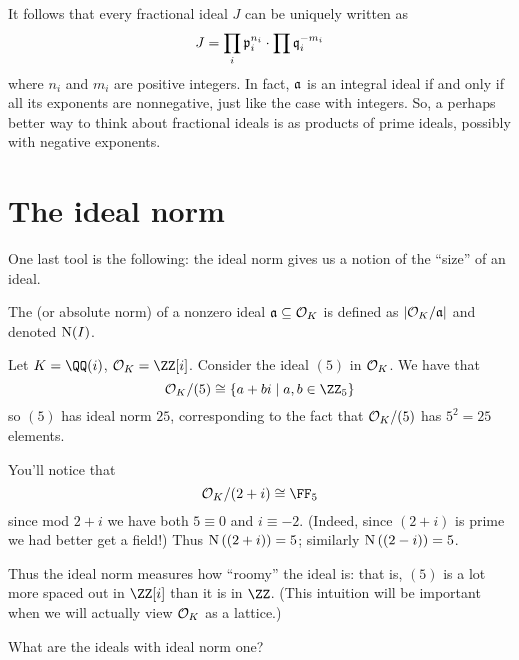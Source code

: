It follows that every fractional ideal $J$ can be uniquely written as
\[ J = \prod_i \pp_i^{n_i} \cdot \prod \qq_i^{-m_i} \]
where $n_i$ and $m_i$ are positive integers.
In fact, $\aa$ is an integral ideal if and only if all its exponents are nonnegative,
just like the case with integers.
So, a perhaps better way to think about fractional ideals is
as products of prime ideals, possibly with negative exponents.

\section{The ideal norm}
One last tool is the following:
the ideal norm gives us a notion of the ``size'' of an ideal.
\begin{definition}
	The  (or absolute norm)
	of a nonzero ideal $\aa \subseteq \OO_K$ is defined as
	$\left\lvert \OO_K / \aa \right\rvert$ and denoted $\Norm(I)$.
\end{definition}
\begin{example}
	Let $K = \QQ(i)$, $\OO_K = \ZZ[i]$.
	Consider the ideal $(5)$ in $\OO_K$.
	We have that 
	\[ \OO_K / (5) \cong \{ a+bi \mid a,b \in \Zc5 \} \]
	so $(5)$ has ideal norm $25$,
	corresponding to the fact that $\OO_K/(5)$ has $5^2=25$ elements.
\end{example}

\begin{example}
	You'll notice that \[ \OO_K / (2+i) \cong \FF_5 \]
	since mod $2+i$ we have both $5 \equiv 0$ and $i \equiv -2$.
	(Indeed, since $(2+i)$ is prime we had better get a field!)
	Thus $\Norm\left( (2+i) \right) = 5$; similarly $\Norm\left( (2-i) \right) = 5$.
\end{example}

Thus the ideal norm measures how ``roomy'' the ideal is:
that is, $(5)$ is a lot more spaced out in $\ZZ[i]$ than it is in $\ZZ$.
(This intuition will be important when we will actually view $\OO_K$ as a lattice.)

\begin{ques}
	What are the ideals with ideal norm one?
\end{ques}

